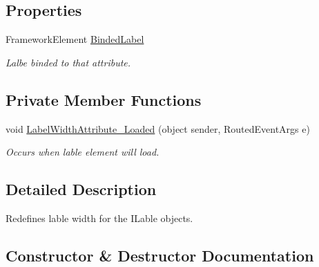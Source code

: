 \subsection*{Properties}
\begin{DoxyCompactItemize}
\item 
Framework\+Element \mbox{\hyperlink{class_wpf_handler_1_1_u_i_1_1_auto_layout_1_1_options_1_1_label_width_attribute_ae3a052219f7ebdf78dc6e47962a9f8b9}{Binded\+Label}}
\begin{DoxyCompactList}\small\item\em Lalbe binded to that attribute. \end{DoxyCompactList}\end{DoxyCompactItemize}
\subsection*{Private Member Functions}
\begin{DoxyCompactItemize}
\item 
void \mbox{\hyperlink{class_wpf_handler_1_1_u_i_1_1_auto_layout_1_1_options_1_1_label_width_attribute_a16e03ce7309091450367210b02392b1b}{Label\+Width\+Attribute\+\_\+\+Loaded}} (object sender, Routed\+Event\+Args e)
\begin{DoxyCompactList}\small\item\em Occurs when lable element will load. \end{DoxyCompactList}\end{DoxyCompactItemize}


\subsection{Detailed Description}
Redefines lable width for the I\+Lable objects. 



\subsection{Constructor \& Destructor Documentation}
\mbox{\label{class_wpf_handler_1_1_u_i_1_1_auto_layout_1_1_options_1_1_label_width_attribute_a466768b6dfd74a49bcae860cb52ab7ab}} 
